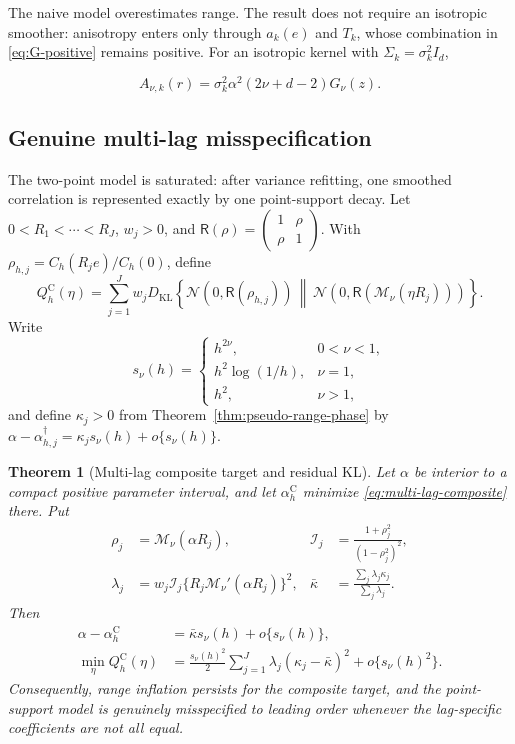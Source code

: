 \documentclass[11pt]{article}
\newtheorem{theorem}{Theorem}
\theoremstyle{remark}
\newcommand{\Matern}{\mathcal M}
\newcommand{\KL}{D_{\mathrm{KL}}}
\newcommand{\Normal}{\mathcal N}
\begin{document}
The naive model overestimates range.  The result does not require an isotropic
smoother: anisotropy enters only through \(a_k(e)\) and \(T_k\), whose combination
in \eqref{eq:G-positive} remains positive.  For an isotropic kernel with
\(\Sigma_k=\sigma_k^2I_d\),

\begin{equation}
  A_{\nu,k}(r)=\sigma_k^2\alpha^2(2\nu+d-2)G_\nu(z).
\end{equation}

\subsection{Genuine multi-lag misspecification}

The two-point model is saturated: after variance refitting, one smoothed
correlation is represented exactly by one point-support decay. Let
\(0<R_1<\cdots<R_J\), \(w_j>0\), and
\(\mathsf R(\rho)=\left(\begin{smallmatrix}1&\rho\\\rho&1\end{smallmatrix}\right)\).
With \(\rho_{h,j}=C_h(R_j e)/C_h(0)\), define
\begin{equation}
 Q_h^{\mathrm C}(\eta)=\sum_{j=1}^J w_j
 \KL\!\left\{\Normal(0,\mathsf R(\rho_{h,j}))\,\middle\|\,
 \Normal(0,\mathsf R(\Matern_\nu(\eta R_j)))\right\}.
 \label{eq:multi-lag-composite}
\end{equation}
Write
\begin{equation}
 s_\nu(h)=
 \begin{cases}
 h^{2\nu},&0<\nu<1,\\
 h^2\log(1/h),&\nu=1,\\
 h^2,&\nu>1,
 \end{cases}
\end{equation}
and define \(\kappa_j>0\) from Theorem~\ref{thm:pseudo-range-phase} by
\(\alpha-\alpha_{h,j}^\dagger=\kappa_j s_\nu(h)+o\{s_\nu(h)\}\).

\begin{theorem}[Multi-lag composite target and residual KL]
\label{thm:multi-lag}
Let \(\alpha\) be interior to a compact positive parameter interval, and let
\(\alpha_h^{\mathrm C}\) minimize \eqref{eq:multi-lag-composite} there. Put
\begin{align}
 \rho_j&=\Matern_\nu(\alpha R_j),&
 \mathcal I_j&=\frac{1+\rho_j^2}{(1-\rho_j^2)^2},\\
 \lambda_j&=w_j\mathcal I_j\{R_j\Matern_\nu'(\alpha R_j)\}^2,&
 \bar\kappa&=\frac{\sum_j\lambda_j\kappa_j}{\sum_j\lambda_j}.
\end{align}
Then
\begin{align}
 \alpha-\alpha_h^{\mathrm C}
 &=\bar\kappa s_\nu(h)+o\{s_\nu(h)\},
 \label{eq:multi-lag-shift}\\
 \min_\eta Q_h^{\mathrm C}(\eta)
 &=\frac{s_\nu(h)^2}{2}\sum_{j=1}^J
 \lambda_j(\kappa_j-\bar\kappa)^2+o\{s_\nu(h)^2\}.
 \label{eq:multi-lag-kl}
\end{align}
Consequently, range inflation persists for the composite target, and the
point-support model is genuinely misspecified to leading order whenever the
lag-specific coefficients are not all equal.
\end{theorem}
\end{document}
